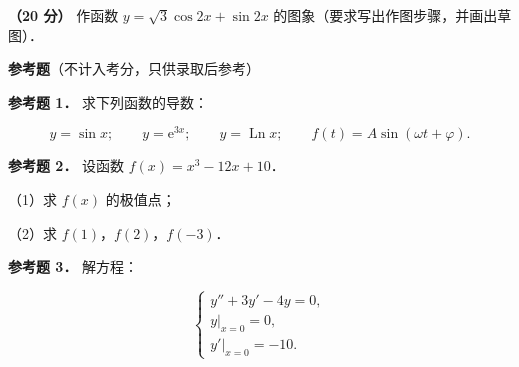 \begin{question}
\textbf{（20 分）} 作函数 $y=\sqrt3\cos 2x+\sin 2x$ 的图象（要求写出作图步骤，并画出草图）．

\begin{gktip}
\textbf{参考题}（不计入考分，只供录取后参考）
\end{gktip}

\textbf{参考题 1．} 求下列函数的导数：

\nopagebreak[4]
\[
y=\sin x;\qquad y=\mathrm e^{3x};\qquad y=\operatorname{Ln}x;\qquad f(t)=A\sin(\omega t+\varphi).
\]

\textbf{参考题 2．} 设函数 $f(x)=x^3-12x+10$．

（1）求 $f(x)$ 的极值点；

（2）求 $f(1)$，$f(2)$，$f(-3)$．

\textbf{参考题 3．} 解方程：

\nopagebreak[4]
\[
\begin{cases}
y''+3y'-4y=0,\\
y\big|_{x=0}=0,\\
y'\big|_{x=0}=-10.
\end{cases}
\]

\end{question}